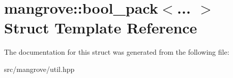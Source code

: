 \hypertarget{structmangrove_1_1bool__pack}{}\section{mangrove\+:\+:bool\+\_\+pack$<$... $>$ Struct Template Reference}
\label{structmangrove_1_1bool__pack}


The documentation for this struct was generated from the following file\+:\begin{DoxyCompactItemize}
\item 
src/mangrove/util.\+hpp\end{DoxyCompactItemize}
